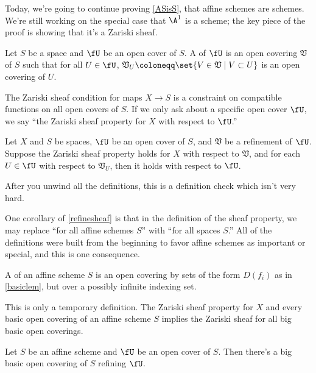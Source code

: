 Today, we're going to continue proving \cref{ASisS}, that affine schemes are schemes. We're still working on the
special case that $\A^1$ is a scheme; the key piece of the proof is showing that it's a Zariski sheaf.
\begin{defn}
Let $S$ be a space and $\fU$ be an open cover of $S$. A  of $\fU$ is an open covering $\mathfrak
V$ of $S$ such that for all $U\in\fU$, $\mathfrak V_U\coloneqq \set{V\in\mathfrak V\mid V\subset U}$ is an open
covering of $U$.
\end{defn}
The Zariski sheaf condition for maps $X\to S$ is a constraint on compatible functions on all open covers of $S$. If
we only ask about a specific open cover $\fU$, we say ``the Zariski sheaf property for $X$ with respect to $\fU$.''
\begin{lem}
\label{refinesheaf}
Let $X$ and $S$ be spaces, $\fU$ be an open cover of $S$, and $\mathfrak V$ be a refinement of $\fU$. Suppose the
Zariski sheaf property holds for $X$ with respect to $\mathfrak V$, and for each $U\in\fU$ with respect to
$\mathfrak V_U$, then it holds with respect to $\fU$.
\end{lem}
After you unwind all the definitions, this is a definition check which isn't very hard.
\begin{rem}
One corollary of \cref{refinesheaf} is that in the definition of the sheaf property, we may replace ``for all
affine schemes $S$'' with ``for all spaces $S$.'' All of the definitions were built from the beginning to favor
affine schemes as important or special, and this is one consequence.
\end{rem}
\begin{defn}
A  of an affine scheme $S$ is an open covering by sets of the form $D(f_i)$ as in
\cref{basiclem}, but over a possibly infinite indexing set.
\end{defn}
This is only a temporary definition. The Zariski sheaf property for $X$ and every basic open
covering of an affine scheme $S$ implies the Zariski sheaf for all big basic open coverings.
\begin{prop}
\label{bigprop}
Let $S$ be an affine scheme and $\fU$ be an open cover of $S$. Then there's a big basic open covering of $S$ refining
$\fU$.
\end{prop}

